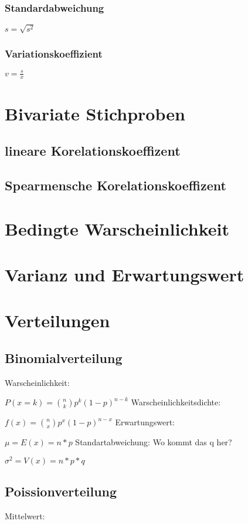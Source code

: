 \documentclass[a4paper, 11pt]{article}
\begin{document}
\subsubsection{Standardabweichung}
$s=\sqrt{s^2}$
\subsubsection{Variationskoeffizient}
$v=\frac{s}{\bar{x}}$
\section{Bivariate Stichproben}
\subsection{lineare Korelationskoeffizent}
\subsection{Spearmensche Korelationskoeffizent}
\section{Bedingte Warscheinlichkeit}
\section{Varianz und Erwartungswert}
\section{Verteilungen}
\subsection{Binomialverteilung}
Warscheinlichkeit:

\newline $P(x=k) = \binom{n}{k} p^k (1-p)^{n-k}$
\newline\newline Warscheinlichkeitsdichte:

$f(x) = \binom{n}{x} p^x(1-p)^{n-x}$
\newline\newline Erwartungswert:

$\mu = E(x) = n * p$
\newline\newline Standartabweichung:
Wo kommt das q her?

$\sigma^2 = V(x)= n * p * q$
\subsection{Poissionverteilung}
Mittelwert:
\end{document}
